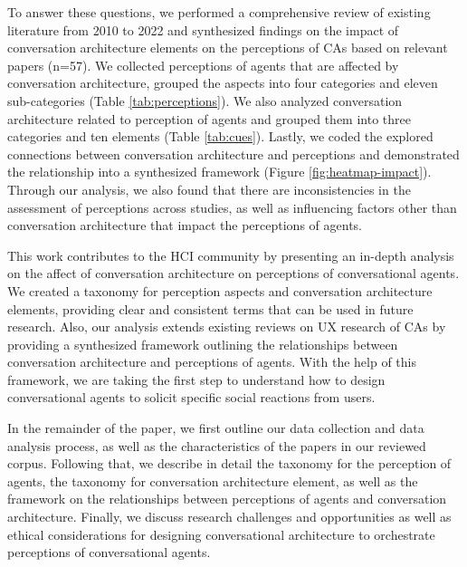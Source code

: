 \documentclass[sigconf,screen,review, anonymous]{acmart}
\begin{document}
To answer these questions, we performed a comprehensive review of existing literature from 2010 to 2022 and synthesized findings on the impact of conversation architecture elements on the perceptions of CAs based on relevant papers (n=57). We collected perceptions of agents that are affected by conversation architecture,  grouped the aspects into four categories and eleven sub-categories (Table \ref{tab:perceptions}). We also analyzed conversation architecture related to perception of agents and grouped them into three categories and ten elements (Table \ref{tab:cues}). Lastly, we coded the explored connections between conversation architecture and perceptions and demonstrated the relationship into a synthesized framework (Figure \ref{fig:heatmap-impact}). Through our analysis, we also found that there are inconsistencies in the assessment of perceptions across studies, as well as influencing factors other than conversation architecture that impact the perceptions of agents.

This work contributes to the HCI community by presenting an in-depth analysis on the affect of conversation architecture on perceptions of conversational agents. We created a taxonomy for perception aspects and conversation architecture elements, providing clear and consistent terms that can be used in future research. Also, our analysis extends existing reviews on UX research of CAs \cite{clark2019state}\cite{rapp2021human}\cite{zheng2022ux} by providing a synthesized framework outlining the relationships between conversation architecture and perceptions of agents. With the help of this framework, we are taking the first step to understand how to design conversational agents to solicit specific social reactions from users.

In the remainder of the paper, we first outline our data collection and data analysis process, as well as the characteristics of the papers in our reviewed corpus. Following that, we describe in detail the taxonomy for the perception of agents, the taxonomy for conversation architecture element, as well as the framework on the relationships between perceptions of agents and conversation architecture. Finally, we discuss research challenges and opportunities as well as ethical considerations for designing conversational architecture to orchestrate perceptions of conversational agents.


\end{document}
